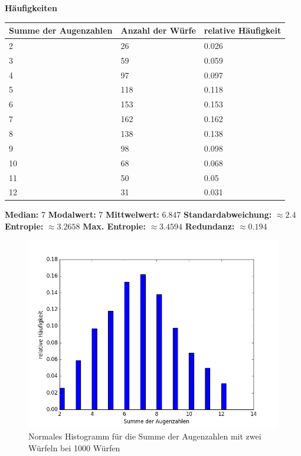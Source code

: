 \documentclass[fleqn,a4paper,12pt]{article}
\begin{document}
  \textbf{Häufigkeiten}
  \begin{center}
    \begin{tabular}{ | l | l | l | }
      \hline
      Summe der Augenzahlen & Anzahl der Würfe & relative Häufigkeit \\ \hline
      2 & 26 & 0.026 \\ \hline
      3 & 59 & 0.059 \\ \hline
      4 & 97 & 0.097 \\ \hline
      5 & 118 & 0.118 \\ \hline
      6 & 153 & 0.153 \\ \hline
      7 & 162 & 0.162 \\ \hline
      8 & 138 & 0.138 \\ \hline
      9 & 98 & 0.098 \\ \hline
      10 & 68 & 0.068 \\ \hline
      11 & 50 & 0.05 \\ \hline
      12 & 31 & 0.031 \\ \hline
    \end{tabular}  
  \end{center}
  \textbf{Median:} 7 \newline
  \textbf{Modalwert:} 7 \newline
  \textbf{Mittwelwert:} 6.847 \newline
  \textbf{Standardabweichung:} $\approx 2.4$ \newline
  \textbf{Entropie:} $\approx 3.2658$ \newline
  \textbf{Max. Entropie:} $\approx 3.4594$ \newline
  \textbf{Redundanz:} $\approx 0.194$ \newline
  \begin{figure}
    \includegraphics[width=1.0\textwidth]{histo3.png}
    \caption{Normales Histogramm für die Summe der Augenzahlen mit zwei Würfeln bei 1000 Würfen}
  \end{figure}
\end{document}
